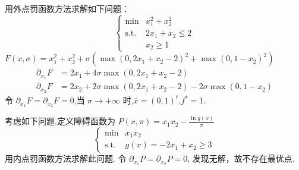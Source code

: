 

\newcommand\Title{最优化方法第13次作业}

\newcommand\subject{\operatorname{s.t.}}

\renewcommand{\labelenumi}{(\arabic*)}


\begin{problem}
    用外点罚函数方法求解如下问题：\[\begin{cases}
        \min &x_1^2 + x_2^2\\
        \subject &2x_1 + x_2 \le 2\\
        &x_2 \ge 1
    \end{cases}\]
    \Answer $F(x, \sigma) = x_1^2 + x_2^2 + \sigma\left(\max(0, 2x_1 + x_2 - 2)^2 + \max(0, 1 - x_2)^2\right)$
    \begin{align*}
        \partial_{x_1}F &= 2x_1 + 4\sigma\max(0, 2x_1 + x_2 - 2)\\
        \partial_{x_2}F &= 2x_2 + 2\sigma\max(0, 2x_1 + x_2 - 2) - 2\sigma\max(0, 1 - x_2) 
    \end{align*}  
    令 $\partial_{x_1}F = \partial_{x_2}F = 0$,当 $\sigma \to +\infty$ 时,$\bar{x} = (0, 1)^t$,$f^* = 1$.
\end{problem}

\begin{problem}
    考虑如下问题,定义障碍函数为 $P(x, \pi) = x_1x_2 - \frac{\ln g(x)}{\pi}$\[\begin{cases}
        \min &x_1x_2\\
        \subject &g(x) = -2x_1 + x_2 \ge 3
    \end{cases}\]
    用内点罚函数方法求解此问题.
    \Answer 令 $\partial_{x_1}P = \partial_{x_2}P = 0$, 发现无解，故不存在最优点.
\end{problem}

